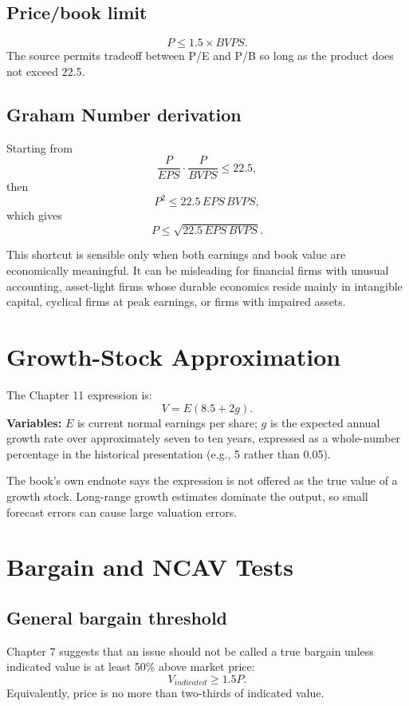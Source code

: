 \documentclass[11pt]{article}
\begin{document}
\subsection{Price/book limit}
\begin{equation}
P \le 1.5\times BVPS.
\end{equation}
The source permits tradeoff between P/E and P/B so long as the product does not exceed 22.5.

\subsection{Graham Number derivation}
Starting from
\[
\frac{P}{EPS}\cdot\frac{P}{BVPS}\le22.5,
\]
then
\[
P^2\le22.5\,EPS\,BVPS,
\]
which gives
\[
P\le\sqrt{22.5\,EPS\,BVPS}.
\]
\begin{cautionbox}
This shortcut is sensible only when both earnings and book value are economically meaningful. It can be misleading for financial firms with unusual accounting, asset-light firms whose durable economics reside mainly in intangible capital, cyclical firms at peak earnings, or firms with impaired assets.
\end{cautionbox}

\section{Growth-Stock Approximation}
The Chapter 11 expression is:
\begin{equation}
V=E(8.5+2g).
\end{equation}
\textbf{Variables:} $E$ is current normal earnings per share; $g$ is the expected annual growth rate over approximately seven to ten years, expressed as a whole-number percentage in the historical presentation (e.g., 5 rather than 0.05).

\begin{cautionbox}
The book's own endnote says the expression is not offered as the true value of a growth stock. Long-range growth estimates dominate the output, so small forecast errors can cause large valuation errors.
\end{cautionbox}

\section{Bargain and NCAV Tests}
\subsection{General bargain threshold}
Chapter 7 suggests that an issue should not be called a true bargain unless indicated value is at least 50\% above market price:
\begin{equation}
V_{indicated} \ge 1.5P.
\end{equation}
Equivalently, price is no more than two-thirds of indicated value.
\end{document}
